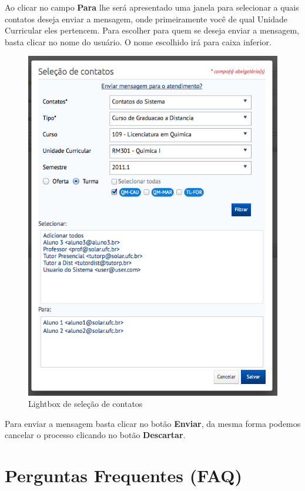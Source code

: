 \documentclass[letterpaper,10pt,english]{sphinxmanual}
\begin{document}
Ao clicar no campo \textbf{Para} lhe será apresentado uma janela para selecionar a quais contatos deseja enviar a mensagem, onde primeiramente você de qual Unidade Curricular eles pertencem. Para escolher para quem se deseja enviar a mensagem, basta clicar no nome do usuário. O nome escolhido irá para caixa inferior.
\begin{figure}[htbp]
\centering
\capstart

\includegraphics{messages-compose-lightbox.png}
\caption{Lightbox de seleção de contatos}\end{figure}

Para enviar a mensagem basta clicar no botão \textbf{Enviar}, da mesma forma podemos cancelar o processo clicando no botão \textbf{Descartar}.


\section{Perguntas Frequentes (FAQ)}
\label{faq:perguntas-frequentes-faq}\label{faq::doc}
\end{document}
